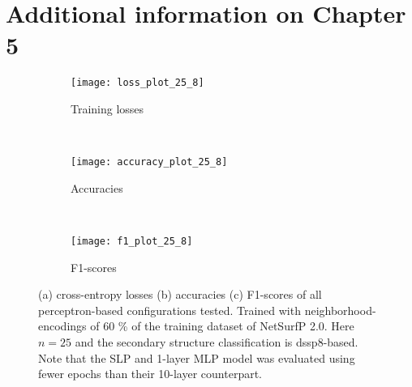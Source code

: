 \chapter{Additional information on Chapter 5}\label{app:chp5}
\begin{figure}[H]
    \centering
    \begin{minipage}[b]{.6\textwidth}
        \begin{subfigure}[b]{\textwidth}
        \texttt{[image: loss\_plot\_25\_8]}
        \caption{Training losses}
        \label{fig:loss}
    \end{subfigure}
    \end{minipage}
    \\
    \centering
    \begin{minipage}[b]{.6\textwidth}
    \begin{subfigure}[b]{\textwidth}
        \texttt{[image: accuracy\_plot\_25\_8]}
        \caption{Accuracies}
        \label{fig:accuracy}
    \end{subfigure}
    \end{minipage}
    \\
    \centering
    \begin{minipage}[b]{.6\textwidth}
    \begin{subfigure}[b]{\textwidth}
        \texttt{[image: f1\_plot\_25\_8]}
        \caption{F1-scores}\label{fig:f1}
    \end{subfigure}
    \end{minipage}
    \caption{(a) cross-entropy losses (b) accuracies (c) F1-scores of all perceptron-based configurations tested. Trained with neighborhood-encodings of 60 \% of the training dataset of NetSurfP 2.0. Here $n=25$ and the secondary structure classification is dssp8-based. Note that the SLP and 1-layer MLP model was evaluated using fewer epochs than their 10-layer counterpart.}\label{fig:she2}
    \end{figure}

